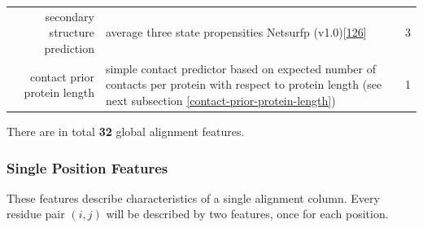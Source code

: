 \documentclass[12pt,a4paper,twoside]{book}
\theoremstyle{definition}
\theoremstyle{definition}
\theoremstyle{remark}
\begin{document}
\begin{longtable}[]{@{}rlc@{}}
\begin{minipage}[t]{0.23\columnwidth}
secondary structure prediction\strut
\end{minipage} & \begin{minipage}[t]{0.50\columnwidth}\raggedright\strut
average three state propensities Netsurfp
(v1.0){[}\protect\hyperlink{ref-Petersen2009a}{126}{]}\strut
\end{minipage} & \begin{minipage}[t]{0.18\columnwidth}\centering\strut
3\strut
\end{minipage}\tabularnewline
\begin{minipage}[t]{0.23\columnwidth}\raggedleft\strut
contact prior protein length\strut
\end{minipage} & \begin{minipage}[t]{0.50\columnwidth}\raggedright\strut
simple contact predictor based on expected number of contacts per
protein with respect to protein length (see next subsection
\ref{contact-prior-protein-length})\strut
\end{minipage} & \begin{minipage}[t]{0.18\columnwidth}\centering\strut
1\strut
\end{minipage}\tabularnewline
\bottomrule
\end{longtable}

There are in total \textbf{32} global alignment features.

\subsubsection{Single Position Features}\label{seq-features-single}

These features describe characteristics of a single alignment column.
Every residue pair \((i,j)\) will be described by two features, once for
each position.
\end{document}
